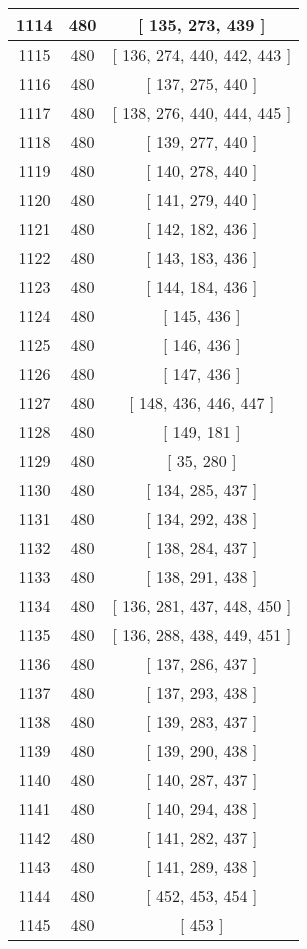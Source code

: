\begin{center}
\begin{longtable}[H]{|| c c c ||}
\hline
1114 & 480 & [ 135, 273, 439 ] \\ 
\hline
1115 & 480 & [ 136, 274, 440, 442, 443 ] \\ 
\hline
1116 & 480 & [ 137, 275, 440 ] \\ 
\hline
1117 & 480 & [ 138, 276, 440, 444, 445 ] \\ 
\hline
1118 & 480 & [ 139, 277, 440 ] \\ 
\hline
1119 & 480 & [ 140, 278, 440 ] \\ 
\hline
1120 & 480 & [ 141, 279, 440 ] \\ 
\hline
1121 & 480 & [ 142, 182, 436 ] \\ 
\hline
1122 & 480 & [ 143, 183, 436 ] \\ 
\hline
1123 & 480 & [ 144, 184, 436 ] \\ 
\hline
1124 & 480 & [ 145, 436 ] \\ 
\hline
1125 & 480 & [ 146, 436 ] \\ 
\hline
1126 & 480 & [ 147, 436 ] \\ 
\hline
1127 & 480 & [ 148, 436, 446, 447 ] \\ 
\hline
1128 & 480 & [ 149, 181 ] \\ 
\hline
1129 & 480 & [ 35, 280 ] \\ 
\hline
1130 & 480 & [ 134, 285, 437 ] \\ 
\hline
1131 & 480 & [ 134, 292, 438 ] \\ 
\hline
1132 & 480 & [ 138, 284, 437 ] \\ 
\hline
1133 & 480 & [ 138, 291, 438 ] \\ 
\hline
1134 & 480 & [ 136, 281, 437, 448, 450 ] \\ 
\hline
1135 & 480 & [ 136, 288, 438, 449, 451 ] \\ 
\hline
1136 & 480 & [ 137, 286, 437 ] \\ 
\hline
1137 & 480 & [ 137, 293, 438 ] \\ 
\hline
1138 & 480 & [ 139, 283, 437 ] \\ 
\hline
1139 & 480 & [ 139, 290, 438 ] \\ 
\hline
1140 & 480 & [ 140, 287, 437 ] \\ 
\hline
1141 & 480 & [ 140, 294, 438 ] \\ 
\hline
1142 & 480 & [ 141, 282, 437 ] \\ 
\hline
1143 & 480 & [ 141, 289, 438 ] \\ 
\hline
1144 & 480 & [ 452, 453, 454 ] \\ 
\hline
1145 & 480 & [ 453 ] \\ 

\end{longtable}
\end{center}
